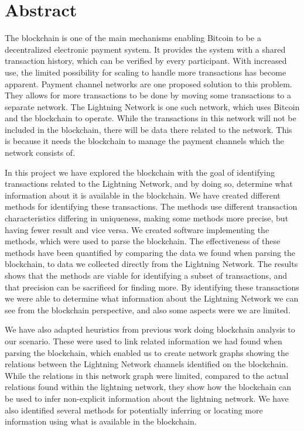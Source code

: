 \chapter*{Abstract}

The blockchain is one of the main mechanisms enabling Bitcoin to be a decentralized electronic payment system. It provides the system with a shared transaction history, which can be verified by every participant. With increased use, the limited possibility for scaling to handle more transactions has become apparent. Payment channel networks are one proposed solution to this problem. They allows for more transactions to be done by moving some transactions to a separate network. The Lightning Network is one such network, which uses Bitcoin and the blockchain to operate. While the transactions in this network will not be included in the blockchain, there will be data there related to the network. This is because it needs the blockchain to manage the payment channels which the network consists of. 

In this project we have explored the blockchain with the goal of identifying transactions related to the Lightning Network, and by doing so, determine what information about it is available in the blockchain. We have created different methods for identifying these transactions. The methods use different transaction characteristics differing in uniqueness, making some methods more precise, but having fewer result and vice versa. We created software implementing the methods, which 
were used to parse the blockchain. The effectiveness of these methods have been quantified by comparing the data we found when parsing the blockchain, to data we collected directly from the Lightning Network. The results shows that the methods are viable for identifying a subset of transactions, and that precision can be sacrificed for finding more.
By identifying these transactions we were able to determine what information about the Lightning Network we can see from the blockchain perspective, and also some aspects were we are limited. 

We have also adapted heuristics from previous work doing blockchain analysis to our scenario.
These were used to link related information we had found when parsing the blockchain, which enabled us to create network graphs showing the relations between the Lightning Network channels identified on the blockchain. While the relations in this network graph were limited, compared to the actual relations found within the lightning network, they show how the blockchain can be used to infer non-explicit information about the lightning network. We have also identified several methods for potentially inferring or locating more information using what is available in the blockchain.

